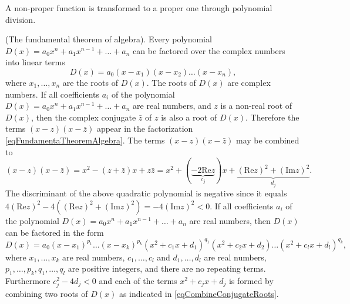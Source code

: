 \documentclass[12pt]{book}
\renewcommand{\Im}{\mathrm{Im}}
\renewcommand{\Re}{\mathrm{Re}}
\begin{document}
A non-proper function is transformed to a proper one through polynomial 
division.

(The fundamental theorem of algebra). Every polynomial $D(x)= a_0x^n+a_{1}x^{n-1}+\dots + a_n$ can be factored over the complex numbers into linear terms 
\begin{equation}\label{eqFundamentaTheoremAlgebra}
D(x)=a_0(x-x_1)(x-x_2)\dots (x-x_n),
\end{equation}
where $x_1,\dots, x_n$ are the roots of $D(x)$. The roots of $D(x)$ are complex numbers.
If all coefficients $a_i$ of the polynomial $D(x)= a_0x^n+a_{1}x^{n-1}+\dots + a_n$ are real numbers, and $z$ is a non-real root of $D(x)$, then the complex conjugate $\bar z$ of $z$ is also a root of $D(x)$. Therefore the terms  $(x-z)(x-\bar z)$ appear in the factorization \eqref{eqFundamentaTheoremAlgebra}. The terms $(x-z)(x-\bar z)$ may be combined to 
\begin{equation}\label{eqCombineConjugateRoots}
(x-z)(x-\bar z)= x^2- (z+\bar z)x + z\bar z = x^{2}+ (\underbrace{-2\Re z}_{c_j})x+ \underbrace{(\Re z)^2+(\Im z)^2}_{d_j}.
\end{equation}
The discriminant of the above quadratic polynomial is negative since it equals $4(\Re z)^2- 4((\Re z)^2+(\Im z)^2)= -4(\Im z)^2<0$. 
If all coefficients $a_i$ of the polynomial $D(x)= a_0x^n+a_{1}x^{n-1}+\dots + a_n$ are real numbers, then $D(x)$ can be factored in the form 
\begin{equation}\label{eqFactorOverReals}
D(x)= a_0(x-x_1)^{p_1}\dots (x-x_k)^{p_k} (x^2+c_1x+d_1)^{q_1}(x^2+c_2x+d_2)\dots (x^2+c_lx +d_l)^{q_k},
\end{equation}
where $x_1, \dots, x_k$ are real numbers, $c_1, \dots, c_l$ and $d_1,\dots, d_l$ are real numbers, $p_1,\dots, p_k, q_1, \dots, q_l$ are positive integers, and there are no repeating terms. Furthermore $c_j^2-4d_j<0$ and each of the terms $x^2+c_j x+d_j$ is formed by combining two  roots of $D(x)$ as indicated in \eqref{eqCombineConjugateRoots}. 
\end{document}
